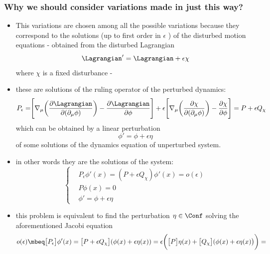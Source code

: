 \documentclass[a4paper,11pt]{scrartcl}
\begin{document}
       \subsubsection*{ Why we should consider variations made in just this way?}
    \begin{itemize}
        \item This variations are chosen among all the possible variations because they correspond to the solutions (up to first order in $\epsilon$ ) of the disturbed motion equations
           - obtained from the disturbed Lagrangian
           $$\Lagrangian' = \Lagrangian  + \epsilon \chi $$
           where $\chi$ is a fixed disturbance - 
           \item these are solutions of the ruling operator of the perturbed dynamics:
        $$ P_\epsilon = \Biggr[ \nabla_\mu \biggr( \frac{\partial \Lagrangian}{\partial(\partial_\mu \phi)} \biggr) - \frac{\partial \Lagrangian}{\partial \phi} \Biggr] + \epsilon \Biggr[ \nabla_\mu \biggr( \frac{\partial \chi}{\partial(\partial_\mu \phi)} \biggr) - \frac{\partial \chi}{\partial \phi} \Biggr]
            = P + \epsilon Q_\chi        $$
           which can be obtained by a linear perturbation 
           $$ \phi' = \phi + \epsilon \eta$$
           of some solutions of the dynamics equation of unperturbed system. \\
           \item in other words they are the solutions of the system:
               \begin{displaymath}
                      \begin{cases} 
                      & P_\epsilon \phi'(x) = (P + \epsilon Q_\chi ) \phi'(x) = o(\epsilon)  \\ 
                    & P \phi(x) = 0 \\
                    & \phi' = \phi + \epsilon \eta
                \end{cases}             
               \end{displaymath}
           \item this problem is equivalent to find the perturbation $\eta \in \Conf$ solving the aforementioned Jacobi equation
           \begin{align*}
            o(\epsilon) &\mbeq \big[P_\epsilon\big] \phi'(x) =  \big[ P + \epsilon Q_\chi        \big]( \phi(x) + \epsilon \eta(x)) 
            = \epsilon \biggr( \big[P\big] \eta(x) + \big[Q_\chi \big]( \phi(x) + \epsilon \eta(x)\big)\biggr) = \\

\end{align*}
\end{itemize}
\end{document}
